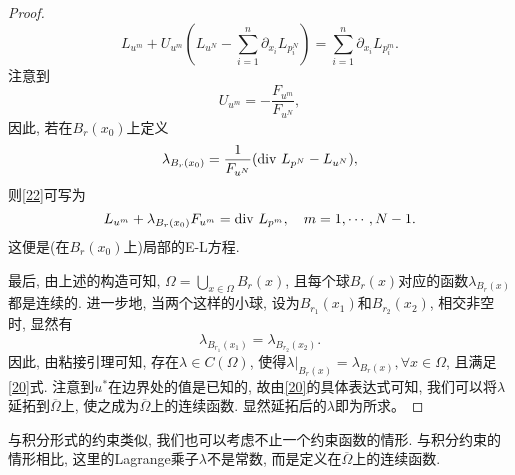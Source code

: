 \begin{proposition}
\begin{proof}
\begin{equation}
            L_{u^m} + U_{u^m}\left(L_{u^N} - \sum_{i = 1}^n\partial_{x_i}L_{p_i^N}\right) = \sum_{i = 1}^n\partial_{x_i}L_{p_i^m}.
        \end{equation}
        注意到 
        \begin{equation*}
            U_{u^m} = -\frac{F_{u^m}}{F_{u^N}}, 
        \end{equation*}
        因此, 若在$B_r(x_0)$上定义 
        \begin{equation*}
            \lambda_{B_r(x_0)} = \frac{1}{F_{u^N}}({\rm div}\ L_{p^N} - L_{u^N}),
        \end{equation*}
        则\eqref{22}可写为 
        \begin{equation*}
            L_{u^m} + \lambda_{B_r(x_0)} F_{u^m} = {\rm div}\ L_{p^m}, \quad m = 1, \cdots, N - 1.            
        \end{equation*}
        这便是(在$B_r(x_0)$上)局部的E-L方程.

        最后, 由上述的构造可知, $\Omega = \bigcup_{x \in \Omega}B_r(x)$, 且每个球$B_r(x)$对应的函数$\lambda_{B_r(x)}$都是连续的.
        进一步地, 当两个这样的小球, 设为$B_{r_1}(x_1)$和$B_{r_2}(x_2)$, 相交非空时, 显然有
        \begin{equation*}
            \lambda_{B_{r_1}(x_1)} = \lambda_{B_{r_2}(x_2)}. 
        \end{equation*}
        因此, 由粘接引理可知, 存在$\lambda \in C(\Omega)$, 使得$\lambda|_{B_r(x)} = \lambda_{B_r(x)}, \forall x \in \Omega$, 且满足\eqref{20}式.
        注意到$u^*$在边界处的值是已知的, 故由\eqref{20}的具体表达式可知, 我们可以将$\lambda$延拓到$\overline{\Omega}$上, 使之成为$\overline{\Omega}$上的连续函数.
        显然延拓后的$\lambda$即为所求。
    \end{proof}
\end{proposition}

与积分形式的约束类似, 我们也可以考虑不止一个约束函数的情形. 与积分约束的情形相比, 这里的Lagrange乘子$\lambda$不是常数, 而是定义在$\overline{\Omega}$上的连续函数.

